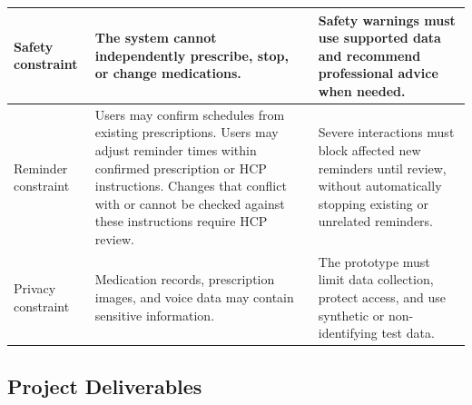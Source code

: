 \begin{longtable}{|L{0.18\textwidth}|L{0.35\textwidth}|L{0.35\textwidth}|}
Safety constraint
& The system cannot independently prescribe, stop,
or change medications.
& Safety warnings must use supported data and recommend
professional advice when needed.
\\ \hline

Reminder constraint
& Users may confirm schedules from existing prescriptions.
Users may adjust reminder times within
confirmed prescription or HCP instructions.
Changes that conflict with or cannot be
checked against these instructions require
HCP review.
& Severe interactions must block affected new reminders
until review, without automatically stopping existing
or unrelated reminders.
\\ \hline

Privacy constraint
& Medication records, prescription images, and voice
data may contain sensitive information.
& The prototype must limit data collection, protect access,
and use synthetic or non-identifying test data.
\\ \hline

\end{longtable}


\subsection{Project Deliverables}

